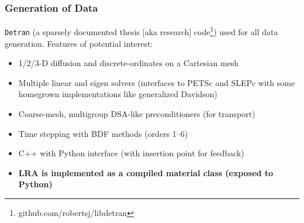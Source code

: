 \documentclass[fleqn]{beamer}
\begin{document}
    
\begin{frame}

\frametitle{Generation of Data}

{\tt Detran} (a sparsely documented thesis [aka research] code\footnote{github.com/robertsj/libdetran}) used for all data generation.  
Features of potential interest:
\begin{itemize}
  \item 1/2/3-D diffusion and discrete-ordinates on a Cartesian mesh
  \item Multiple linear and eigen solvers (interfaces to PETSc and SLEPc with some homegrown implementations like generalized Davidson)
  \item Coarse-mesh, multigroup DSA-like preconditioners (for transport)
  \item Time stepping with BDF methods (orders 1--6)
  \item C++ with Python interface (with insertion point for feedback)
  \item {\bf LRA is implemented as a compiled material class (exposed to Python)}
\end{itemize}

\end{frame}
\end{document}
